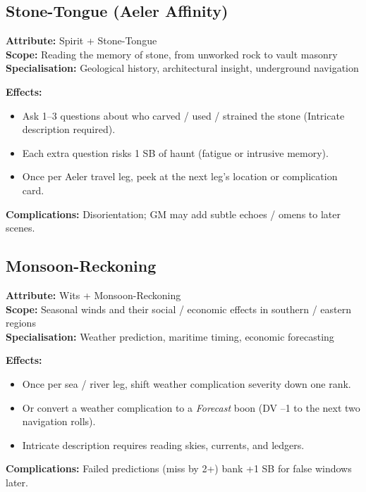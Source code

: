 \subsection{Stone-Tongue (Aeler Affinity)}\label{subsec:stone_tongue}

\textbf{Attribute:} Spirit + Stone-Tongue\\
\textbf{Scope:} Reading the memory of stone, from unworked rock to vault masonry\\
\textbf{Specialisation:} Geological history, architectural insight, underground navigation

\textbf{Effects:}
\begin{itemize}
    \item Ask 1--3 questions about who carved / used / strained the stone (Intricate description required).
    \item Each extra question risks 1 SB of haunt (fatigue or intrusive memory).
    \item Once per Aeler travel leg, peek at the next leg's location or complication card.
\end{itemize}
\textbf{Complications:} Disorientation; GM may add subtle echoes / omens to later scenes.

\subsection{Monsoon-Reckoning}\label{subsec:monsoon_reckoning}

\textbf{Attribute:} Wits + Monsoon-Reckoning\\
\textbf{Scope:} Seasonal winds and their social / economic effects in southern / eastern regions\\
\textbf{Specialisation:} Weather prediction, maritime timing, economic forecasting

\textbf{Effects:}
\begin{itemize}
    \item Once per sea / river leg, shift weather complication severity down one rank.
    \item Or convert a weather complication to a \emph{Forecast} boon (DV --1 to the next two navigation rolls).
    \item Intricate description requires reading skies, currents, and ledgers.
\end{itemize}
\textbf{Complications:} Failed predictions (miss by 2+) bank +1 SB for false windows later.


